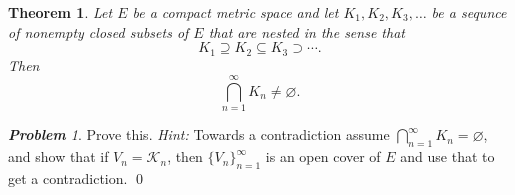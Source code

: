 \documentclass[11pt]{amsart}
\renewcommand{\(}{\left(}
\renewcommand{\)}{\right)}
\renewcommand{\[}{\left[}
\renewcommand{\]}{\right]}
\newtheorem{thm}{Theorem}
\theoremstyle{definition}
\theoremstyle{remark}
\newtheorem{prob}{{\bf Problem}}
\newcommand{\nothing}{\varnothing} %
\newcommand{\hint}{{\emph{Hint:} }}
\begin{document}
\begin{thm}
Let $E$ be a compact metric space and let $K_1,K_2,K_3,\ldots$ be a
sequnce of nonempty closed subsets of $E$ that are nested in the sense
that
$$
K_1\supseteq K_2\subseteq K_3\supset \cdots.
$$
Then 
$$
\bigcap_{n=1}^\infty K_n\ne \nothing.
$$
\end{thm}

\begin{prob}
Prove this. \hint Towards a contradiction assume $\bigcap_{n=1}^\infty
K_n= \nothing$, and show that if $V_n=\mathcal K_n$, then
$\{V_n\}_{n=1}^\infty$ is an open cover of $E$ and use that to get a
contradiction. \qed
\end{prob}


  
 
\end{document}
